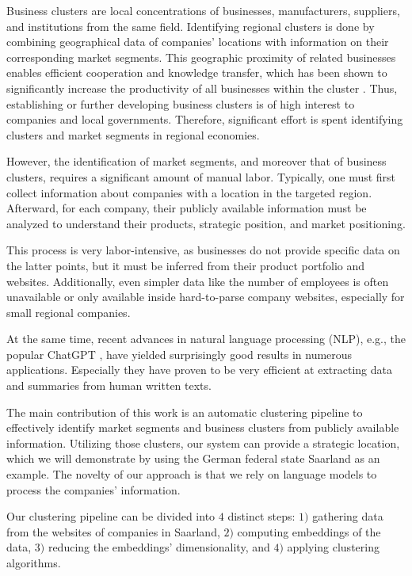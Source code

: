 \documentclass[conference]{IEEEtran}
\begin{document}
Business clusters are local concentrations of businesses, manufacturers, suppliers, and institutions from the same field. Identifying regional clusters is done by combining geographical data of companies' locations with information on their corresponding market segments. This geographic proximity of related businesses enables efficient cooperation and knowledge transfer, which has been shown to significantly increase the productivity of all businesses within the cluster \cite{clustersandcomp,gems-model, regionaladv, clustertheory}. Thus, establishing or further developing business clusters is of high interest to companies and local governments. Therefore, significant effort is spent identifying clusters and market segments in regional economies. 

However, the identification of market segments, and moreover that of business clusters, requires a significant amount of manual labor. Typically, one must first collect information about companies with a location in the targeted region. Afterward, for each company, their publicly available information must be analyzed to understand their products, strategic position, and market positioning. 

This process is very labor-intensive, as businesses do not provide specific data on the latter points, but it must be inferred from their product portfolio and websites. Additionally, even simpler data like the number of employees is often unavailable or only available inside hard-to-parse company websites, especially for small regional companies.

At the same time, recent advances in natural language processing (NLP), e.g., the popular ChatGPT \cite{chatgpt}, have yielded surprisingly good results in numerous applications. Especially they have proven to be very efficient at extracting data and summaries from human written texts.

The main contribution of this work is an automatic clustering pipeline to effectively identify market segments and business clusters from publicly available information. Utilizing those clusters, our system can provide a strategic location, which we will demonstrate by using the German federal state Saarland as an example. The novelty of our approach is that we rely on language models to process the companies' information. 

Our clustering pipeline can be divided into $4$ distinct steps: $1)$ gathering data from the websites of companies in Saarland, $2)$ computing embeddings of the data, $3)$ reducing the embeddings' dimensionality, and $4)$ applying clustering algorithms.
\end{document}

